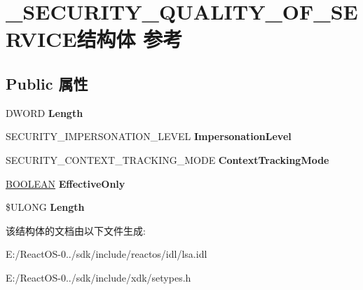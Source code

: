 \hypertarget{struct___s_e_c_u_r_i_t_y___q_u_a_l_i_t_y___o_f___s_e_r_v_i_c_e}{}\section{\+\_\+\+S\+E\+C\+U\+R\+I\+T\+Y\+\_\+\+Q\+U\+A\+L\+I\+T\+Y\+\_\+\+O\+F\+\_\+\+S\+E\+R\+V\+I\+C\+E结构体 参考}
\label{struct___s_e_c_u_r_i_t_y___q_u_a_l_i_t_y___o_f___s_e_r_v_i_c_e}
\subsection*{Public 属性}
\begin{DoxyCompactItemize}
\item 
\mbox{\label{struct___s_e_c_u_r_i_t_y___q_u_a_l_i_t_y___o_f___s_e_r_v_i_c_e_ad3578cc96c0d5fe9b4155a424a84fbfe}} 
D\+W\+O\+RD {\bfseries Length}
\item 
\mbox{\label{struct___s_e_c_u_r_i_t_y___q_u_a_l_i_t_y___o_f___s_e_r_v_i_c_e_ae0193db9a6f380415db53c5bc702b4e3}} 
S\+E\+C\+U\+R\+I\+T\+Y\+\_\+\+I\+M\+P\+E\+R\+S\+O\+N\+A\+T\+I\+O\+N\+\_\+\+L\+E\+V\+EL {\bfseries Impersonation\+Level}
\item 
\mbox{\label{struct___s_e_c_u_r_i_t_y___q_u_a_l_i_t_y___o_f___s_e_r_v_i_c_e_a3501dda7ede19670b2b46138cc82707f}} 
S\+E\+C\+U\+R\+I\+T\+Y\+\_\+\+C\+O\+N\+T\+E\+X\+T\+\_\+\+T\+R\+A\+C\+K\+I\+N\+G\+\_\+\+M\+O\+DE {\bfseries Context\+Tracking\+Mode}
\item 
\mbox{\label{struct___s_e_c_u_r_i_t_y___q_u_a_l_i_t_y___o_f___s_e_r_v_i_c_e_ac099321a3499f22a14c36b43ae5fcaf1}} 
\hyperlink{_processor_bind_8h_a112e3146cb38b6ee95e64d85842e380a}{B\+O\+O\+L\+E\+AN} {\bfseries Effective\+Only}
\item 
\mbox{\label{struct___s_e_c_u_r_i_t_y___q_u_a_l_i_t_y___o_f___s_e_r_v_i_c_e_a9b1e9994f5050abefa788e174e57711e}} 
\$U\+L\+O\+NG {\bfseries Length}
\end{DoxyCompactItemize}


该结构体的文档由以下文件生成\+:\begin{DoxyCompactItemize}
\item 
E\+:/\+React\+O\+S-\/0../sdk/include/reactos/idl/lsa.\+idl\item 
E\+:/\+React\+O\+S-\/0../sdk/include/xdk/setypes.\+h\end{DoxyCompactItemize}
